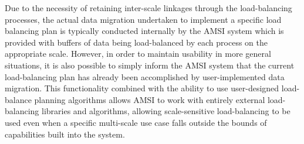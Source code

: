 Due to the necessity of retaining inter-scale linkages through the load-balancing processes, the actual data migration undertaken to implement a specific load balancing plan is typically conducted internally by the AMSI system which is provided with buffers of data being load-balanced by each process on the appropriate scale. However, in order to maintain usability in more general situations, it is also possible to simply inform the AMSI system that the current load-balancing plan has already been accomplished by user-implemented data migration. This functionality combined with the ability to use user-designed load-balance planning algorithms allows AMSI to work with entirely external load-balancing libraries and algorithms, allowing scale-sensitive load-balancing to be used even when a specific multi-scale use case falls outside the bounds of capabilities built into the system.